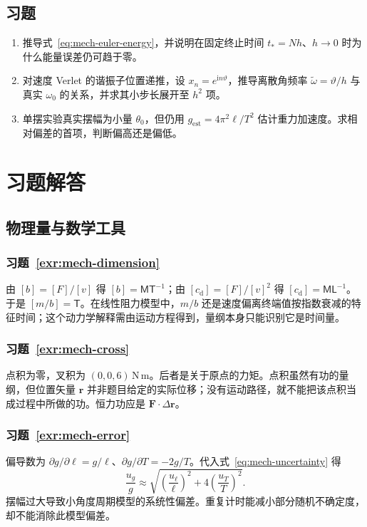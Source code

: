 \documentclass[UTF8,12pt,a4paper,fontset=fandol]{ctexbook}
\begin{document}
\section{习题}
\begin{enumerate}[label=\thechapter.\arabic*,ref=\thechapter.\arabic*]
\item\label{exr:mech-euler-proof} 推导式~\eqref{eq:mech-euler-energy}，并说明在固定终止时间 $t_*=Nh$、$h\to0$ 时为什么能量误差仍可趋于零。
\item\label{exr:mech-verlet-frequency} 对速度 Verlet 的谐振子位置递推，设 $x_n=e^{\mathrm i n\vartheta}$，推导离散角频率 $\widetilde\omega=\vartheta/h$ 与真实 $\omega_0$ 的关系，并求其小步长展开至 $h^2$ 项。
\item\label{exr:mech-pendulum-bias} 单摆实验真实摆幅为小量 $\theta_0$，但仍用 $g_{\mathrm{est}}=4\pi^2\ell/T^2$ 估计重力加速度。求相对偏差的首项，判断偏高还是偏低。
\end{enumerate}

\appendix
\chapter{习题解答}
\label{app:mech-solutions}

\section{物理量与数学工具}
\subsection*{习题~\ref{exr:mech-dimension}}
由 $[b]=[F]/[v]$ 得 $[b]=\mathsf M\mathsf T^{-1}$；由 $[c_{\mathrm d}]=[F]/[v]^2$ 得 $[c_{\mathrm d}]=\mathsf M\mathsf L^{-1}$。于是 $[m/b]=\mathsf T$。在线性阻力模型中，$m/b$ 还是速度偏离终端值按指数衰减的特征时间；这个动力学解释需由运动方程得到，量纲本身只能识别它是时间量。

\subsection*{习题~\ref{exr:mech-cross}}
点积为零，叉积为 $(0,0,6)\,\mathrm{N\,m}$。后者是关于原点的力矩。点积虽然有功的量纲，但位置矢量 $\mathbf r$ 并非题目给定的实际位移；没有运动路径，就不能把该点积当成过程中所做的功。恒力功应是 $\mathbf F\cdot\Delta\mathbf r$。

\subsection*{习题~\ref{exr:mech-error}}
偏导数为 $\partial g/\partial\ell=g/\ell$、$\partial g/\partial T=-2g/T$。代入式~\eqref{eq:mech-uncertainty} 得
\[
 \frac{u_g}{g}\approx\sqrt{\left(\frac{u_\ell}{\ell}\right)^2+4\left(\frac{u_T}{T}\right)^2}.
\]
摆幅过大导致小角度周期模型的系统性偏差。重复计时能减小部分随机不确定度，却不能消除此模型偏差。
\end{document}
